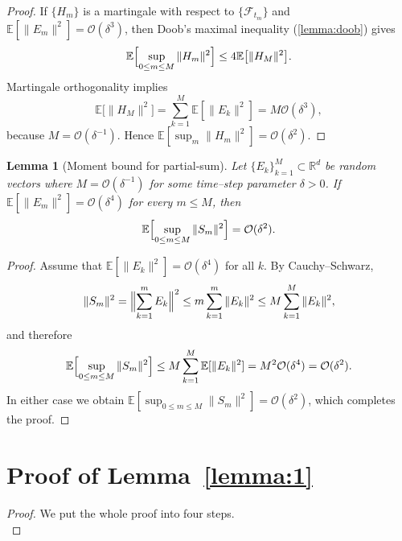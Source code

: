 \documentclass[11pt, a4paper, onecolumn]{article}
\newcommand{\E}{\mathbb{E}}
\newtheorem{lemma}{Lemma}
\begin{document}
\begin{appendices}
\begin{proof}
If $\{H_m\}$ is a martingale with respect to $\{\mathcal F_{t_m}\}$ and 
$\E[\|E_m\|^{2}] = \mathcal O(\delta^{3})$,
then Doob’s maximal inequality (\cref{lemma:doob}) gives
\[
    \E\Bigl[\sup_{0\le m\le M}\|H_m\|^{2}\Bigr]
    \le
    4\E\bigl[\|H_M\|^{2}\bigr].
\]
Martingale orthogonality implies
\[
    \E\bigl[\|H_M\|^{2}\bigr]
    =
    \sum_{k=1}^{M}\E[\|E_k\|^{2}]
    =
    M\mathcal O(\delta^{3}),
\]
because $M=\mathcal O(\delta^{-1})$.  
Hence
$\E[\sup_{m}\|H_m\|^{2}] = \mathcal O(\delta^{2})$.
\end{proof}

\begin{lemma}[Moment bound for partial‐sum]\label{lemma:error-sum-part} Let $\{E_k\}_{k=1}^{M}\subset\mathbb{R}^{d}$ be random vectors where $M = \mathcal{O}(\delta^{-1})$ for some time–step parameter $\delta > 0$. If $\E[\|E_m\|^{2}] = \mathcal{O}(\delta^{4})$ for every $m\le M$, then
\[
    \E\Bigl[\sup_{0\le m\le M} \|S_m\|^{2}\Bigr] 
    = \mathcal{O}(\delta^{2}).
\]
\end{lemma}

\begin{proof}
Assume that $\E[\|E_k\|^{2}] = \mathcal O(\delta^{4})$ for all $k$.
By Cauchy–Schwarz,
\[
    \|S_m\|^{2}
    =
    \Bigl\|\sum_{k=1}^{m}E_k\Bigr\|^{2}
    \le
    m\sum_{k=1}^{m}\|E_k\|^{2}
    \le
    M\sum_{k=1}^{M}\|E_k\|^{2},
\]
and therefore
\[
    \E\Bigl[\sup_{0\le m\le M}\|S_m\|^{2}\Bigr]
    \le
    M\sum_{k=1}^{M}\E[\|E_k\|^{2}]
    =
    M^{2}\mathcal O(\delta^{4})
    =
    \mathcal O(\delta^{2}).
\]
In either case we obtain  
$\E[\sup_{0\le m\le M}\|S_m\|^{2}] = \mathcal O(\delta^{2})$,  
which completes the proof.
\end{proof}


\section{Proof of Lemma~\ref{lemma:1}}\label{app:lemma1}
\begin{proof}
We put the whole proof into four steps.\\


\end{proof}
\end{appendices}
\end{document}
